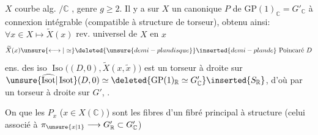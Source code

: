 $X$ courbe alg. $/\mathbb C$ , genre $g\geq2$.
Il y a sur $X$ un  canonique
$P$ de  $\mathrm{GP}(1)_{\mathbb C}=G'_{\mathbb C}$ à connexion intégrable
(compatible à structure de torseur), obtenu ainsi:
$\forall x\in X\longmapsto\widetilde X(x)$ rev. universel de $X$ en $x$
\[
\widetilde X(x)\unsure{\longleftrightarrow|\simeq}
\deleted{\unsure{demi-plan disque}}\inserted{demi-plan de}\text{ Poincaré }D
\]
ens. des iso $\operatorname{Iso}\bigl((D,0),\widetilde X(x,\widetilde x)\bigr)$ est un torseur à droite
sur $\unsure{\widehat{\operatorname{Isot}}|\operatorname{Isot}}(D,0)\simeq
\deleted{\mathrm{GP}(1)_{\mathbb R}\simeq G'_{\mathbb C}}\inserted{S_{\mathbb R}}$,
d'où par  un torseur à droite sur $G'$, 
.

On  que les $P_x$ ($x\in X(\mathbb C)$) sont les fibres
d'un fibré principal  à structure 
(celui associé à $\pi_{\unsure{x|1}}\longrightarrow G'_{\mathbb R}\subset G'_{\mathbb C}$)

